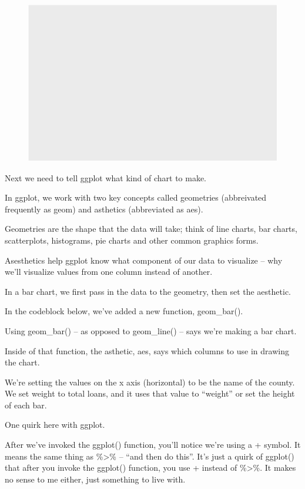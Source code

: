 \documentclass[
  letterpaper,
  DIV=11,
  numbers=noendperiod]{scrreprt}
\begin{document}
\begin{figure}[H]

{\centering \includegraphics{./visualizing-for-reporting_files/figure-pdf/unnamed-chunk-4-1.pdf}

}

\end{figure}

Next we need to tell ggplot what kind of chart to make.

In ggplot, we work with two key concepts called geometries (abbreivated
frequently as geom) and asthetics (abbreviated as aes).

Geometries are the shape that the data will take; think of line charts,
bar charts, scatterplots, histograms, pie charts and other common
graphics forms.

Asesthetics help ggplot know what component of our data to visualize --
why we'll visualize values from one column instead of another.

In a bar chart, we first pass in the data to the geometry, then set the
aesthetic.

In the codeblock below, we've added a new function, geom\_bar().

Using geom\_bar() -- as opposed to geom\_line() -- says we're making a
bar chart.

Inside of that function, the asthetic, aes, says which columns to use in
drawing the chart.

We're setting the values on the x axis (horizontal) to be the name of
the county. We set weight to total loans, and it uses that value to
``weight'' or set the height of each bar.

One quirk here with ggplot.

After we've invoked the ggplot() function, you'll notice we're using a +
symbol. It means the same thing as \%\textgreater\% -- ``and then do
this''. It's just a quirk of ggplot() that after you invoke the ggplot()
function, you use + instead of \%\textgreater\%. It makes no sense to me
either, just something to live with.
\end{document}
